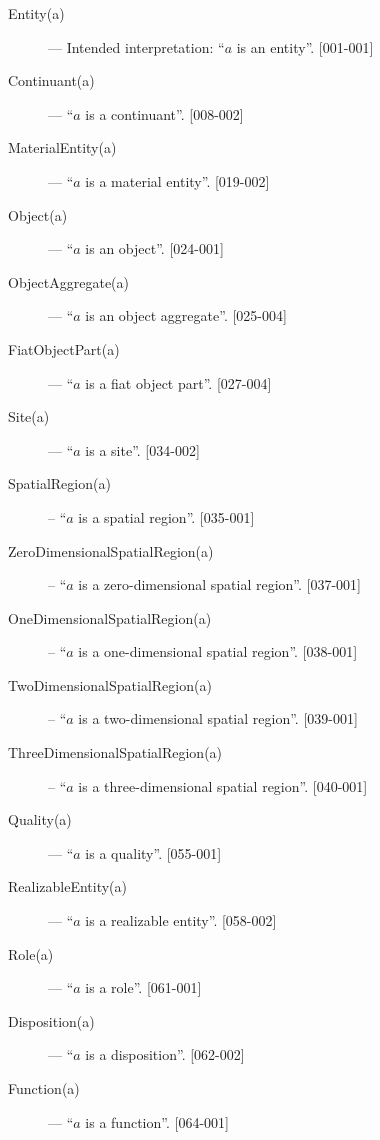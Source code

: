 \documentclass{article}
\begin{document}
\begin{description}

\item[Entity(a)] --- Intended interpretation: ``$a$ is an entity''. [001-001]

\item[Continuant(a)] --- ``$a$ is a continuant''. [008-002]

\item[MaterialEntity(a)] --- ``$a$ is a material entity''. [019-002]

\item[Object(a)] --- ``$a$ is an object''. [024-001]

\item[ObjectAggregate(a)] --- ``$a$ is an object aggregate''. [025-004]

\item[FiatObjectPart(a)] --- ``$a$ is a fiat object part''. [027-004]

\item[Site(a)] --- ``$a$ is a site''. [034-002]

\item[SpatialRegion(a)] -- ``$a$ is a spatial region''. [035-001]

\item[ZeroDimensionalSpatialRegion(a)] -- ``$a$ is a zero-dimensional spatial region''. [037-001]

\item[OneDimensionalSpatialRegion(a)] -- ``$a$ is a one-dimensional spatial region''. [038-001]

\item[TwoDimensionalSpatialRegion(a)] -- ``$a$ is a two-dimensional spatial region''. [039-001]

\item[ThreeDimensionalSpatialRegion(a)] -- ``$a$ is a three-dimensional spatial region''. [040-001]

\item[Quality(a)] --- ``$a$ is a quality''. [055-001]

\item[RealizableEntity(a)] --- ``$a$ is a realizable entity''. [058-002]

\item[Role(a)] --- ``$a$ is a role''. [061-001]

\item[Disposition(a)] --- ``$a$ is a disposition''. [062-002]

\item[Function(a)] --- ``$a$ is a function''. [064-001]


\end{description}
\end{document}

